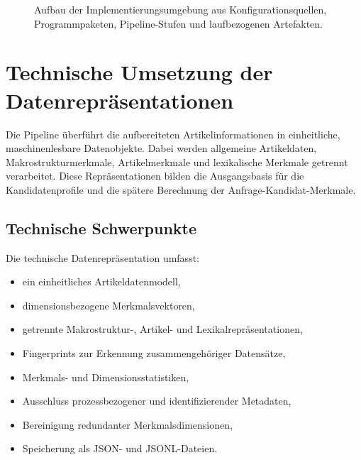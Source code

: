 \begin{figure}[H]
{ } 
        \caption{ Aufbau der Implementierungsumgebung aus Konfigurationsquellen, Programmpaketen, Pipeline-Stufen und laufbezogenen Artefakten. } \label{fig:implementierungsumgebung_softwarestruktur} \end{figure}



\section{Technische Umsetzung der Datenrepräsentationen} 
\label{sec:technische_umsetzung_der_datenrepraesentationen} 

Die Pipeline überführt die aufbereiteten Artikelinformationen in einheitliche, maschinenlesbare Datenobjekte. Dabei werden allgemeine Artikeldaten, Makrostrukturmerkmale, Artikelmerkmale und lexikalische Merkmale getrennt verarbeitet. Diese Repräsentationen bilden die Ausgangsbasis für die Kandidatenprofile und die spätere Berechnung der Anfrage-Kandidat-Merkmale. 

\subsection{Technische Schwerpunkte} 
\label{subsec:technische_schwerpunkte_datenrepraesentationen} 

Die technische Datenrepräsentation umfasst: \begin{itemize} \item ein einheitliches Artikeldatenmodell, \item dimensionsbezogene Merkmalsvektoren, \item getrennte Makrostruktur-, Artikel- und Lexikalrepräsentationen, \item Fingerprints zur Erkennung zusammengehöriger Datensätze, \item Merkmals- und Dimensionsstatistiken, \item Ausschluss prozessbezogener und identifizierender Metadaten, \item Bereinigung redundanter Merkmalsdimensionen, \item Speicherung als JSON- und JSONL-Dateien. \end{itemize} 

